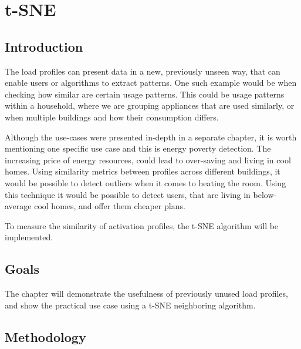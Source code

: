 
\chapter{t-SNE} %

\label{Chapter8} %


\section{Introduction}

The load profiles can present data in a new, previously unseen way, that can enable users or algorithms to extract patterns.
One such example would be when checking how similar are certain usage patterns.
This could be usage patterns within a household, where we are grouping appliances that are used similarly,
or when multiple buildings and how their consumption differs. 

Although the use-cases were presented in-depth in a separate chapter, it is worth mentioning one specific use case and this is energy poverty detection. 
The increasing price of energy resources, could lead to over-saving and living in cool homes.
Using similarity metrics between profiles across different buildings, it would be possible to detect outliers when it comes to heating the room. 
Using this technique it would be possible to detect users, that are living in below-average cool homes, and offer them cheaper plans. 

To measure the similarity of activation profiles, the t-SNE algorithm will be implemented.

\section{Goals}

The chapter will demonstrate the usefulness of previously unused load profiles, and show the practical use case using a t-SNE neighboring algorithm.

\section*{Methodology}

